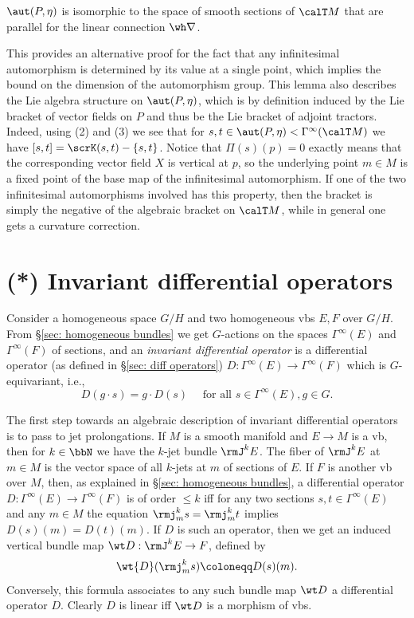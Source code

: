 \begin{cor}
    $\aut(P,\eta)$ is isomorphic to the space of smooth sections of $\calT M$ that are parallel for the linear connection $\wh\nabla$.
\end{cor}

This provides an alternative proof for the fact that any infinitesimal automorphism is determined by its value at a single point, which implies the bound on the dimension of the automorphism group. This lemma also describes the Lie algebra structure on $\aut(P,\eta)$, which is by definition induced by the Lie bracket of vector fields on $P$ and thus be the Lie bracket of adjoint tractors. Indeed, using (2) and (3) we see that for $s,t\in\aut(P,\eta)<\Gamma^\infty(\calT M)$ we have $[s,t]=\scrK(s,t)-\{s,t\}$. Notice that $\Pi(s)(p)=0$ exactly means that the corresponding vector field $X$ is vertical at $p$, so the underlying point $m\in M$ is a fixed point of the base map of the infinitesimal automorphism. If one of the two infinitesimal automorphisms involved has this property, then the bracket is simply the negative of the algebraic bracket on $\calT M$, while in general one gets a curvature correction.






\section{(*) Invariant differential operators}

Consider a homogeneous space $G\slash H$ and two homogeneous \glspl{vb} $E,F$ over $G\slash H$. From \S\ref{sec: homogeneous bundles} we get $G$-actions on the spaces $\Gamma^\infty(E)$ and $\Gamma^\infty(F)$ of sections, and an \emph{invariant differential operator} is a differential operator (as defined in \S\ref{sec: diff operators}) $D:\Gamma^\infty(E)\to \Gamma^\infty(F)$ which is $G$-equivariant, i.e., 
\[D(g\cdot s)=g\cdot D(s)\quad \text{ for all }s\in\Gamma^\infty(E),g\in G.\]

The first step towards an algebraic description of invariant differential operators is to pass to jet prolongations. If $M$ is a smooth manifold and $E\to M$ is a \gls{vb}, then for $k\in \bbN$ we have the $k$-jet bundle $\rmJ^k E$. The fiber of $\rmJ^k E$ at $m\in M$ is the vector space of all $k$-jets at $m$ of sections of $E$. If $F$ is another \gls{vb} over $M$, then, as explained in \S\ref{sec: homogeneous bundles}, a differential operator $D:\Gamma^\infty(E)\to \Gamma^\infty(F)$ is of order $\leq k$ iff for any two sections $s,t\in \Gamma^\infty(E)$ and any $m\in M$ the equation $\rmj^k_m s=\rmj^k_m t$ implies $D(s)(m)=D(t)(m)$. If $D$ is such an operator, then we get an induced vertical bundle map $\wt D:\rmJ^k E\to F$, defined by 
\[\wt{D}(\rmj^k_m s)\coloneqq D(s)(m).\]
Conversely, this formula associates to any such bundle map $\wt D$ a differential operator $D$. Clearly $D$ is linear iff $\wt D$ is a morphism of \glspl{vb}.

